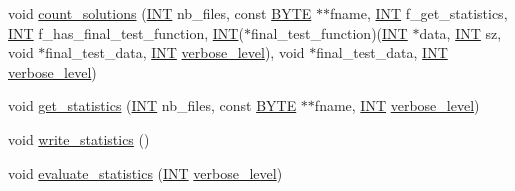 \begin{DoxyCompactItemize}
\item 
void \mbox{\hyperlink{classisomorph_a894cb7cc3e1ce703af74cb8e7aade287}{count\+\_\+solutions}} (\mbox{\hyperlink{galois_8h_a09fddde158a3a20bd2dcadb609de11dc}{I\+NT}} nb\+\_\+files, const \mbox{\hyperlink{galois_8h_ab6cc7b4aeb6ea31aba2b3fbfc83ff5e6}{B\+Y\+TE}} $\ast$$\ast$fname, \mbox{\hyperlink{galois_8h_a09fddde158a3a20bd2dcadb609de11dc}{I\+NT}} f\+\_\+get\+\_\+statistics, \mbox{\hyperlink{galois_8h_a09fddde158a3a20bd2dcadb609de11dc}{I\+NT}} f\+\_\+has\+\_\+final\+\_\+test\+\_\+function, \mbox{\hyperlink{galois_8h_a09fddde158a3a20bd2dcadb609de11dc}{I\+NT}}($\ast$final\+\_\+test\+\_\+function)(\mbox{\hyperlink{galois_8h_a09fddde158a3a20bd2dcadb609de11dc}{I\+NT}} $\ast$data, \mbox{\hyperlink{galois_8h_a09fddde158a3a20bd2dcadb609de11dc}{I\+NT}} sz, void $\ast$final\+\_\+test\+\_\+data, \mbox{\hyperlink{galois_8h_a09fddde158a3a20bd2dcadb609de11dc}{I\+NT}} \mbox{\hyperlink{simeon_8_c_a818073fbcc2f439e7c56952f67386122}{verbose\+\_\+level}}), void $\ast$final\+\_\+test\+\_\+data, \mbox{\hyperlink{galois_8h_a09fddde158a3a20bd2dcadb609de11dc}{I\+NT}} \mbox{\hyperlink{simeon_8_c_a818073fbcc2f439e7c56952f67386122}{verbose\+\_\+level}})
\item 
void \mbox{\hyperlink{classisomorph_a70c817cfed4be5d19ce2c902d161d184}{get\+\_\+statistics}} (\mbox{\hyperlink{galois_8h_a09fddde158a3a20bd2dcadb609de11dc}{I\+NT}} nb\+\_\+files, const \mbox{\hyperlink{galois_8h_ab6cc7b4aeb6ea31aba2b3fbfc83ff5e6}{B\+Y\+TE}} $\ast$$\ast$fname, \mbox{\hyperlink{galois_8h_a09fddde158a3a20bd2dcadb609de11dc}{I\+NT}} \mbox{\hyperlink{simeon_8_c_a818073fbcc2f439e7c56952f67386122}{verbose\+\_\+level}})
\item 
void \mbox{\hyperlink{classisomorph_ae9ebe6e1defa50c76708492862152c9a}{write\+\_\+statistics}} ()
\item 
void \mbox{\hyperlink{classisomorph_ade4cdca1757163cda5a1ff58a75da284}{evaluate\+\_\+statistics}} (\mbox{\hyperlink{galois_8h_a09fddde158a3a20bd2dcadb609de11dc}{I\+NT}} \mbox{\hyperlink{simeon_8_c_a818073fbcc2f439e7c56952f67386122}{verbose\+\_\+level}})
\item 

\end{DoxyCompactItemize}

